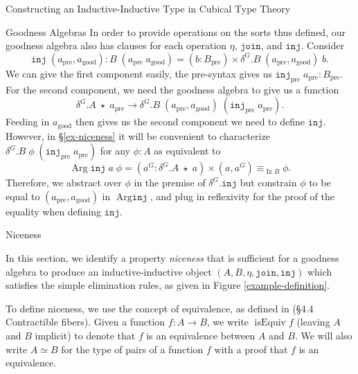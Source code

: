 \documentclass[runningheads]{llncs}
\newcommand{\erase}[1]{{}}
\DeclareMathOperator{\USet}{Set}
\DeclareMathOperator{\isEquiv}{isEquiv}
\DeclareMathOperator{\Arg}{Arg}
\DeclareMathOperator{\Ix}{Ix}
\newcommand{\pre}[1]{{#1}_\text{pre}}
\newcommand{\good}[1]{{#1}_\text{good}}
\newcommand{\Id}[2]{{#1}\equiv{#2}}
\newcommand{\IdA}[3]{{#1}\equiv_{#3}{#2}}
\newcommand{\join}{\texttt{join}}
\newcommand{\inj}{\texttt{inj}}
\begin{document}
\begin{section}{Constructing an Inductive-Inductive Type in Cubical Type Theory}
\begin{subsection}{Goodness Algebras}
{In order to provide operations on the sorts thus defined, our goodness algebra also has clauses for each operation $\eta$, $\join$, and $\inj$. Consider \[\inj\;(\pre{a}, \good{a}) : B\;(\pre{a}\;\good{a}) = (b : \pre{B}) \times \delta^G.B\;(\pre{a}, \good{a})\;b.\] We can give the first component easily, the pre-syntax gives us $\pre{\inj}\;\pre{a} : \pre{B}$. For the second component, we need the goodness algebra to give us a function \[\delta^G.A\;\star\;\pre{a} \to \delta^G.B\;(\pre{a}, \good{a})\;(\pre{\inj}\;\pre{a}).\] Feeding in $\good{a}$ then gives us the second component we need to define $\inj$. However, in \S\ref{ex-niceness} it will be convenient to characterize $\delta^G.B\;\phi\;(\pre{\inj}\;\pre{a})$ for any $\phi : A$ as equivalent to \[\Arg \inj\;a\;\phi = (a^G : \delta^G.A\;\star\;a) \times \IdA{(a , a^G)}{\phi}{\Ix B}.\] Therefore, we abstract over $\phi$ in the premise of $\delta^G.\inj$ but constrain $\phi$ to be equal to $(\pre{a}, \good{a})$ in $\Arg\inj$, and plug in reflexivity for the proof of the equality when defining $\inj$.
}

\end{subsection}

\begin{subsection}{Niceness}\label{ex-niceness}

In this section, we identify a property \emph{niceness} that is sufficient for a goodness algebra to produce an inductive-inductive object $(A, B, \eta, \join, \inj)$ which satisfies the simple elimination rules, as given in Figure \ref{example-definition}.

To define niceness, we use the concept of equivalence, as defined in \citet{hottbook} (\S4.4 Contractible fibers). Given a function $f : A \to B$, we write $\isEquiv f$ (leaving $A$ and $B$ implicit) to denote that $f$ is an equivalence between $A$ and $B$. We will also write $A \simeq B$ for the type of pairs of a function $f$ with a proof that $f$ is an equivalence.

\erase{
\begin{lemma}[\label{equiv-pullback}Pullback over equivalence.]
    If $f$ is an equivalence between $A$ and $B$, $P : B \to \USet$ is a predicate on $B$, and we know $h : (a : A) \to P\;(f\;a)$, then there is a function $p : (b : B) \to P\;b$ such that $\Id{p\;(f\;a)}{h\;a}$ for all $a$.
\end{lemma}
\begin{proof}
    Immediate from the definition of equivalences as functions with contractible fibers.
\end{proof}

}
\end{subsection}
\end{section}
\end{document}
